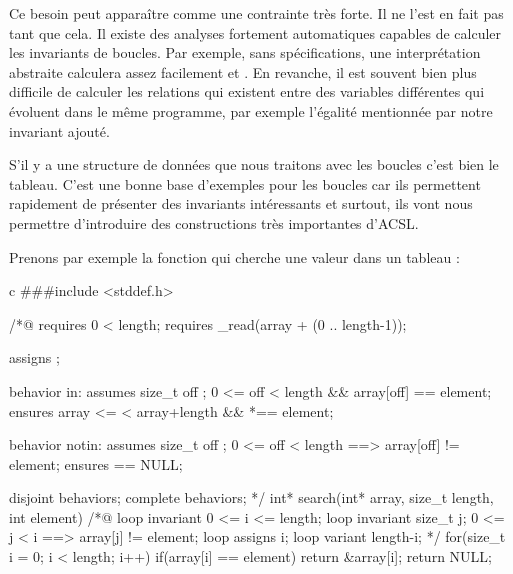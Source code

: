 \documentclass[middle]{zmdocument}
\begin{document}
\begin{Information}
Ce besoin peut apparaître comme une contrainte très forte. Il ne l'est en fait pas
tant que cela. Il existe des analyses fortement automatiques capables de 
calculer les invariants de boucles. Par exemple, sans spécifications, une 
interprétation abstraite calculera assez facilement  et 
. En revanche, il est souvent bien plus difficile
de calculer les relations qui existent entre des variables différentes qui 
évoluent dans le même programme, par exemple l'égalité mentionnée par notre 
invariant ajouté.
\end{Information}






S'il y a une structure de données que nous traitons avec les boucles c'est bien
le tableau. C'est une bonne base d'exemples pour les boucles car ils permettent
rapidement de présenter des invariants intéressants et surtout, ils vont nous 
permettre d'introduire des constructions très importantes d'ACSL.



Prenons par exemple la fonction qui cherche une valeur dans un tableau :



\begin{CodeBlock}{c}
###include <stddef.h>

/*@
  requires 0 < length;
  requires \valid_read(array + (0 .. length-1));
  
  assigns  \nothing;

  behavior in:
    assumes \exists size_t off ; 0 <= off < length && array[off] == element;
    ensures array <= \result < array+length && *\result == element;

  behavior notin:
    assumes \forall size_t off ; 0 <= off < length ==> array[off] != element;
    ensures \result == NULL;

  disjoint behaviors;
  complete behaviors;
*/
int* search(int* array, size_t length, int element){
  /*@
    loop invariant 0 <= i <= length;
    loop invariant \forall size_t j; 0 <= j < i ==> array[j] != element;
    loop assigns i;
    loop variant length-i;
  */ 
  for(size_t i = 0; i < length; i++)
    if(array[i] == element) return &array[i];
  return NULL;
}
\end{CodeBlock}
\end{document}
